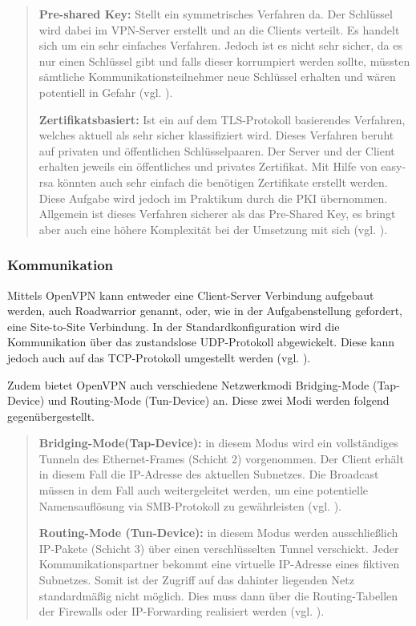 \documentclass[
a4paper,     %
 headsepline, %
footsepline, %
titlepage,   %
 halfparskip,     %
 fleqn,       %
12pt         %
]{scrartcl}  %
\begin{document}
\begin{quotation}
\item[\textbf{Pre-shared Key:}]
Stellt ein symmetrisches Verfahren da. Der Schlüssel wird dabei im VPN-Server erstellt und an die Clients verteilt. Es handelt sich um ein sehr einfaches Verfahren. Jedoch ist es nicht sehr sicher, da es nur einen Schlüssel gibt und falls dieser korrumpiert werden sollte, müssten sämtliche Kommunikationsteilnehmer neue Schlüssel erhalten und wären potentiell in Gefahr (vgl. \cite{openV-1}). 

\item[\textbf{Zertifikatsbasiert:}]
Ist ein auf dem TLS-Protokoll basierendes Verfahren, welches aktuell als sehr sicher klassifiziert wird. Dieses Verfahren beruht auf privaten und öffentlichen Schlüsselpaaren. Der Server und der Client erhalten jeweils ein öffentliches und privates Zertifikat. Mit Hilfe von easy-rsa könnten auch sehr einfach die benötigen Zertifikate erstellt werden. Diese Aufgabe wird jedoch im Praktikum durch die PKI übernommen. Allgemein ist dieses Verfahren sicherer als das Pre-Shared Key, es bringt aber auch eine höhere Komplexität bei der Umsetzung mit sich (vgl. \cite{openV-1}). 
\end{quotation} 

\subsubsection{Kommunikation}

Mittels OpenVPN kann entweder eine Client-Server Verbindung aufgebaut werden, auch Roadwarrior genannt, oder, wie in der Aufgabenstellung gefordert, eine Site-to-Site Verbindung. In der Standardkonfiguration wird die Kommunikation über das zustandslose UDP-Protokoll abgewickelt. Diese kann jedoch auch auf das TCP-Protokoll umgestellt werden (vgl. \cite{openV-1}). 

Zudem bietet OpenVPN auch verschiedene Netzwerkmodi Bridging-Mode (Tap-Device) und Routing-Mode (Tun-Device) an. 
Diese zwei Modi werden folgend gegenübergestellt. 

\begin{quotation}
\item[\textbf{Bridging-Mode(Tap-Device):}]
in diesem Modus wird ein vollständiges Tunneln des Ethernet-Frames (Schicht 2) vorgenommen. Der Client erhält in diesem Fall die IP-Adresse des aktuellen Subnetzes. Die Broadcast müssen in dem Fall auch weitergeleitet werden, um eine potentielle Namensauflösung via SMB-Protokoll zu gewährleisten (vgl. \cite{openV-1}).

\item[\textbf{Routing-Mode (Tun-Device):}]
in diesem Modus werden ausschließlich IP-Pakete (Schicht 3) über einen verschlüsselten Tunnel verschickt. Jeder Kommunikationspartner bekommt eine virtuelle IP-Adresse eines fiktiven Subnetzes. Somit ist der Zugriff auf das dahinter liegenden Netz standardmäßig nicht möglich. Dies muss dann über die Routing-Tabellen der Firewalls  oder IP-Forwarding realisiert werden (vgl. \cite{openV-1}).
\end{quotation}
\end{document}
